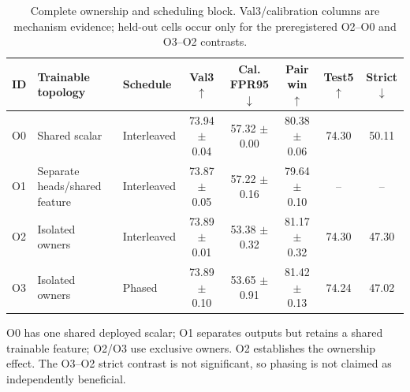 \begin{table}[t]
\centering
\caption{Complete ownership and scheduling block. Val3/calibration columns are mechanism evidence; held-out cells occur only for the preregistered O2--O0 and O3--O2 contrasts.}
\label{tab:supp-ownership-grid}
\scriptsize
\setlength{\tabcolsep}{2.4pt}
\begin{tabular}{lllccccc}\toprule
ID & Trainable topology & Schedule & Val3$\uparrow$ & Cal. FPR95$\downarrow$ & Pair win$\uparrow$ & Test5$\uparrow$ & Strict$\downarrow$\\\midrule
O0 & Shared scalar & Interleaved & 73.94 $\pm$ 0.04 & 57.32 $\pm$ 0.00 & 80.38 $\pm$ 0.06 & 74.30 & 50.11 \\
O1 & Separate heads/shared feature & Interleaved & 73.87 $\pm$ 0.05 & 57.22 $\pm$ 0.16 & 79.64 $\pm$ 0.10 & -- & -- \\
O2 & Isolated owners & Interleaved & 73.89 $\pm$ 0.01 & 53.38 $\pm$ 0.32 & 81.17 $\pm$ 0.32 & 74.30 & 47.30 \\
O3 & Isolated owners & Phased & 73.89 $\pm$ 0.10 & 53.65 $\pm$ 0.91 & 81.42 $\pm$ 0.13 & 74.24 & 47.02 \\
\bottomrule\end{tabular}
\parbox{0.97\textwidth}{\scriptsize O0 has one shared deployed scalar; O1 separates outputs but retains a shared trainable feature; O2/O3 use exclusive owners. O2 establishes the ownership effect. The O3--O2 strict contrast is not significant, so phasing is not claimed as independently beneficial.}
\end{table}
